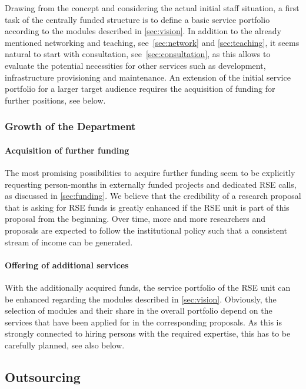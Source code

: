 \documentclass[a4paper]{article}
\begin{document}
Drawing from the concept and considering the actual initial staff situation, a first task of the centrally funded structure is to define a basic service portfolio according to the modules described in \autoref{sec:vision}.
In addition to the already mentioned networking and teaching, see~\autoref{sec:network} and \autoref{sec:teaching}, it seems natural to start with consultation, see~\autoref{sec:consultation},
as this allows to evaluate the potential necessities for other services such as development, infrastructure provisioning and maintenance.
An extension of the initial service portfolio for a larger target audience requires the acquisition of funding for further positions, see below.

\subsubsection{Growth of the Department}

\paragraph{Acquisition of further funding}
The most promising possibilities to acquire further funding seem to be explicitly requesting person-months in externally funded projects and dedicated RSE calls, as discussed in \autoref{sec:funding}.
We believe that the credibility of a research proposal that is asking for RSE funds is greatly enhanced if the RSE unit is part of this proposal from the beginning.
Over time, more and more researchers and proposals are expected to follow the institutional policy such that a consistent stream of income can be generated.

\paragraph{Offering of additional services}
With the additionally acquired funds, the service portfolio of the RSE unit can be enhanced regarding the modules described in \autoref{sec:vision}.
Obviously, the selection of modules and their share in the overall portfolio depend on the services that have been applied for in the corresponding proposals.
As this is strongly connected to hiring persons with the required expertise, this has to be carefully planned, see also below.


\subsection{Outsourcing}
\end{document}

